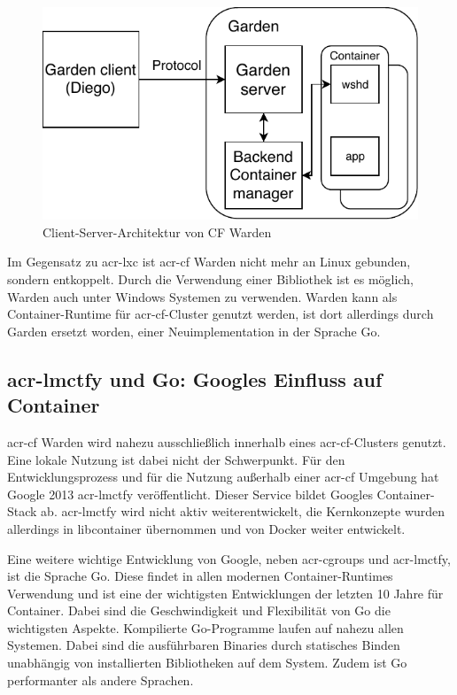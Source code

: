 \begin{figure}[h]
	\begin{center}
		\includegraphics{bilder/cf-warden-arch.pdf}
		\caption{Client-Server-Architektur von CF Warden \citep{CFGardenbackEndsContainerSecurityDebugging}}
		\label{fig:wardenArch}
	\end{center}
\end{figure}

Im Gegensatz zu \gls{acr-lxc} ist \gls{acr-cf} Warden nicht mehr an Linux gebunden, sondern entkoppelt. Durch die Verwendung einer Bibliothek ist es möglich, Warden auch unter Windows Systemen zu verwenden. Warden kann als Container-Runtime für \gls{acr-cf}-Cluster genutzt werden, ist dort allerdings durch Garden ersetzt worden, einer Neuimplementation in der Sprache Go.

\subsection{\gls{acr-lmctfy} und Go: Googles Einfluss auf Container}
\label{sec:geschichteLMCTFY}
\gls{acr-cf} Warden wird nahezu ausschließlich innerhalb eines \gls{acr-cf}-Clusters genutzt. Eine lokale Nutzung ist dabei nicht der Schwerpunkt. Für den Entwicklungsprozess und für die Nutzung außerhalb einer \gls{acr-cf} Umgebung hat Google 2013 \gls{acr-lmctfy} veröffentlicht. Dieser Service bildet Googles Container-Stack ab. \gls{acr-lmctfy} wird nicht aktiv weiterentwickelt, die Kernkonzepte wurden allerdings in libcontainer übernommen und von Docker weiter entwickelt.

Eine weitere wichtige Entwicklung von Google, neben \glspl{acr-cgroup} und \gls{acr-lmctfy}, ist die Sprache Go. Diese findet in allen modernen Container-Runtimes Verwendung und ist eine der wichtigsten Entwicklungen der letzten 10 Jahre für Container. Dabei sind die Geschwindigkeit und Flexibilität von Go die wichtigsten Aspekte. Kompilierte Go-Programme laufen auf nahezu allen Systemen. Dabei sind die ausführbaren Binaries durch statisches Binden unabhängig von installierten Bibliotheken auf dem System. Zudem ist Go performanter als andere Sprachen.

